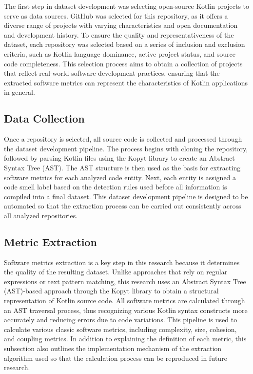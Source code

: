 \documentclass[]{einformatica}
\begin{document}
The first step in dataset development was selecting open-source Kotlin projects to serve as data sources. GitHub was selected for this repository, as it offers a diverse range of projects with varying characteristics and open documentation and development history. To ensure the quality and representativeness of the dataset, each repository was selected based on a series of inclusion and exclusion criteria, such as Kotlin language dominance, active project status, and source code completeness. This selection process aims to obtain a collection of projects that reflect real-world software development practices, ensuring that the extracted software metrics can represent the characteristics of Kotlin applications in general.

\subsection{Data Collection}

Once a repository is selected, all source code is collected and processed through the dataset development pipeline. The process begins with cloning the repository, followed by parsing Kotlin files using the Kopyt library to create an Abstract Syntax Tree (AST). The AST structure is then used as the basis for extracting software metrics for each analyzed code entity. Next, each entity is assigned a code smell label based on the detection rules used before all information is compiled into a final dataset. This dataset development pipeline is designed to be automated so that the extraction process can be carried out consistently across all analyzed repositories.

\subsection{Metric Extraction}

Software metrics extraction is a key step in this research because it determines the quality of the resulting dataset. Unlike approaches that rely on regular expressions or text pattern matching, this research uses an Abstract Syntax Tree (AST)-based approach through the Kopyt library to obtain a structural representation of Kotlin source code. All software metrics are calculated through an AST traversal process, thus recognizing various Kotlin syntax constructs more accurately and reducing errors due to code variations. This pipeline is used to calculate various classic software metrics, including complexity, size, cohesion, and coupling metrics. In addition to explaining the definition of each metric, this subsection also outlines the implementation mechanism of the extraction algorithm used so that the calculation process can be reproduced in future research.
\end{document}
